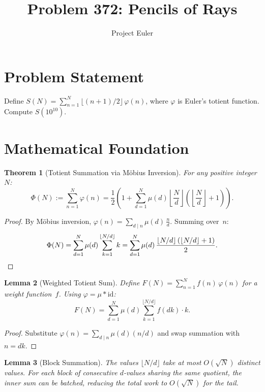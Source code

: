 \documentclass[12pt]{article}
\title{Problem 372: Pencils of Rays}
\author{Project Euler}
\date{}
\newtheorem{theorem}{Theorem}
\newtheorem{lemma}[theorem]{Lemma}
\begin{document}
\maketitle

\section{Problem Statement}

Define $S(N) = \sum_{n=1}^{N} \lfloor(n+1)/2\rfloor\,\varphi(n)$, where $\varphi$ is Euler's totient function. Compute $S(10^{10})$.

\section{Mathematical Foundation}

\begin{theorem}[Totient Summation via M\"obius Inversion]
For any positive integer~$N$:
\[
\Phi(N) := \sum_{n=1}^{N} \varphi(n) = \frac{1}{2}\!\left(1 + \sum_{d=1}^{N} \mu(d)\left\lfloor \frac{N}{d}\right\rfloor\!\left(\left\lfloor \frac{N}{d}\right\rfloor + 1\right)\right).
\]
\end{theorem}

\begin{proof}
By M\"obius inversion, $\varphi(n) = \sum_{d \mid n} \mu(d)\,\frac{n}{d}$. Summing over~$n$:
\[
\Phi(N) = \sum_{d=1}^{N} \mu(d) \sum_{k=1}^{\lfloor N/d\rfloor} k
= \sum_{d=1}^{N} \mu(d)\,\frac{\lfloor N/d\rfloor\,(\lfloor N/d\rfloor+1)}{2}. \qedhere
\]
\end{proof}

\begin{lemma}[Weighted Totient Sum]
Define $F(N) = \sum_{n=1}^{N} f(n)\,\varphi(n)$ for a weight function~$f$. Using $\varphi = \mu * \mathrm{id}$:
\[
F(N) = \sum_{d=1}^{N} \mu(d) \sum_{k=1}^{\lfloor N/d\rfloor} f(dk)\cdot k.
\]
\end{lemma}

\begin{proof}
Substitute $\varphi(n) = \sum_{d \mid n}\mu(d)(n/d)$ and swap summation with $n = dk$.
\end{proof}

\begin{lemma}[Block Summation]
The values $\lfloor N/d \rfloor$ take at most $O(\sqrt{N})$ distinct values. For each block of consecutive $d$-values sharing the same quotient, the inner sum can be batched, reducing the total work to $O(\sqrt{N})$ for the tail.
\end{lemma}
\end{document}
